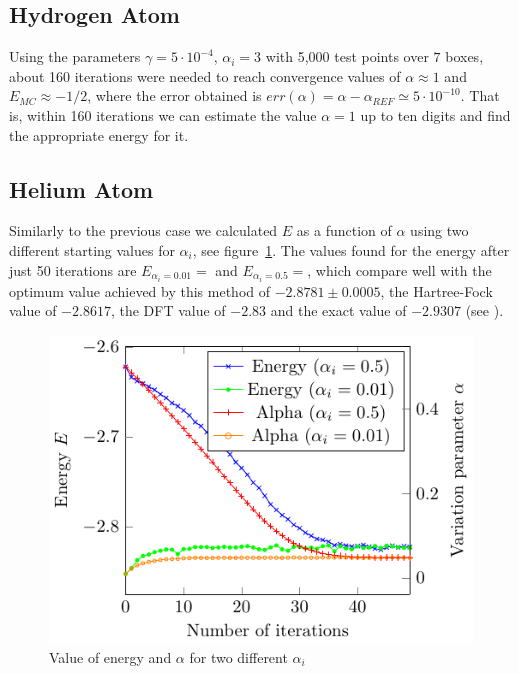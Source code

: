 \subsection{Hydrogen Atom}
Using the parameters
$\gamma = 5\cdot 10^{-4}$, $\alpha_i = 3 $ with 5,000
test points over $7$ boxes, about 160 iterations were needed to reach convergence
values of $\alpha \approx 1$ and $E_{MC} \approx - 1/2$, where the error obtained is
$err(\alpha) = \alpha-\alpha_{REF} \simeq 5 \cdot 10^{-10}$. That is, within 160
iterations we can estimate the value $\alpha=1$ up to ten digits and find the appropriate energy for it.


\subsection{Helium Atom}

Similarly to the previous case we calculated $E$ as a function of $\alpha$
using two different starting values for $\alpha_i$, see figure~\ref{fig:He_it}.
The values found for the energy after just 50 iterations are
$E_{\alpha_i = 0.01} =  $ and $E_{\alpha_i = 0.5} =  $, which
compare well with the optimum value achieved by this method
of $-2.8781 \pm 0.0005$, the Hartree-Fock value of $-2.8617$,
the DFT value of $-2.83$ and the exact value of $-2.9307$ (see \cite{JosBook}). %

\begin{figure}[th]
  \begin{center}
  \includegraphics[scale=1 ]{graphs/he-e-alpha-iterations.pdf}
  \caption{
	Value of energy and $\alpha$ for two different $\alpha_i$
  	}
  \label{fig:He_it}
  \end{center}
\end{figure}
